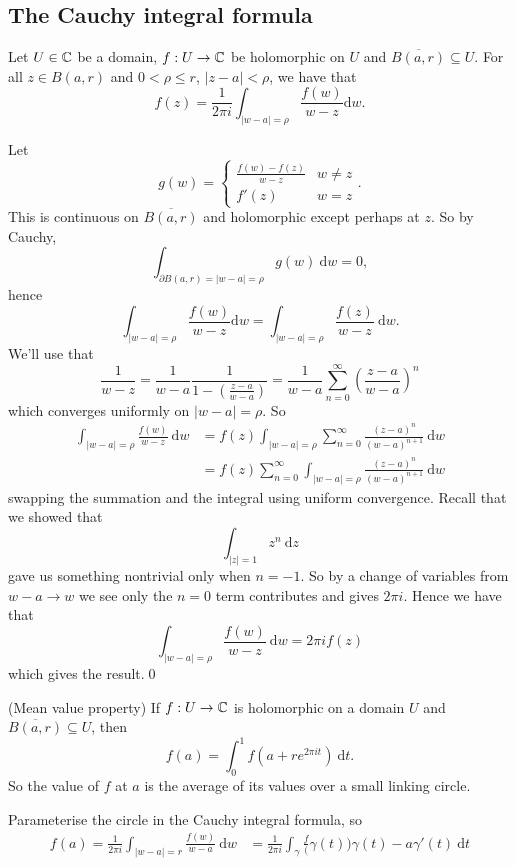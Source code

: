 \documentclass{article}
\begin{document}
\subsection{The Cauchy integral formula}
\begin{theorem}
	Let $ U\in \mathbb{C} $ be a domain, $ f:U\to \mathbb{C} $ be holomorphic on $ U $ and $ \overline{B(a,r)}\subseteq U $. For all $ z\in B(a,r) $ and $ 0<\rho \le r $, $ |z-a|<\rho $, we have that
	\[
		f(z) = \frac 1{2\pi i}\int_{|w-a|=\rho} \frac{f(w)}{w-z}\mathrm dw.
	\]
\end{theorem}
\pf Let
\[
	g(w) = \begin{cases}
		\frac{f(w)-f(z)}{w-z} & w\ne z\\
		f'(z) & w = z
	\end{cases}.
\]
This is continuous on $ \overline{B(a,r)} $ and holomorphic except perhaps at $ z $. So by Cauchy,
\[
	\int_{\partial B(a,r) = |w-a|=\rho}g(w)\ \mathrm dw = 0,
\]
hence
\[
	\int_{|w-a|=\rho} \frac{f(w)}{w-z}\mathrm dw = \int_{|w-a|=\rho} \frac{f(z)}{w-z}\ \mathrm dw.
\]
We'll use that
\[
	\frac1{w-z} =\frac1{w-a}\frac 1{1-\left(\frac{z-a}{w-a}\right)} = \frac 1{w-a}\sum_{n=0}^\infty \left(\frac {z-a}{w-a}\right)^n
\]
which converges uniformly on $ |w-a|=\rho $. So
\begin{align*}
	\int_{|w-a|=\rho}\frac{f(w)}{w-z}\ \mathrm dw &= f(z) \int_{|w-a|=\rho} \sum_{n=0}^\infty \frac{(z-a)^n}{(w-a)^{n+1}}\ \mathrm dw\\
						      &= f(z)\sum_{n=0}^\infty \int_{|w-a|=\rho}\frac{(z-a)^n}{(w-a)^{n+1}}\ \mathrm dw
\end{align*}
swapping the summation and the integral using uniform convergence. Recall that we showed that
\[
	\int_{|z|=1} z^n \ \mathrm dz
\]
gave us something nontrivial only when $ n=-1 $. So by a change of variables from $ w-a\to w $ we see only the $ n=0 $ term contributes and gives $ 2\pi i $. Hence we have that
\[
	\int_{|w-a|=\rho} \frac{f(w)}{w-z}\ \mathrm dw = 2\pi i f(z)
\]
which gives the result.\qed
\begin{corollary}
	(Mean value property) If $ f:U\to \mathbb{C} $ is holomorphic on a domain $ U $ and $ \overline{B(a,r)}\subseteq U $, then
	\[
		f(a) = \int_0^1 f(a+re^{2\pi i t}) \ \mathrm dt.
	\]
	So the value of $ f $ at $ a $ is the average of its values over a small linking circle.
\end{corollary}
\pf Parameterise the circle in the Cauchy integral formula, so
\begin{align*}
	f(a) = \frac 1{2\pi i} \int_{|w-a|= r} \frac {f(w)}{w-a}\ \mathrm dw &= \frac 1{2\pi i} \int_\gamma \frac f(\gamma(t)){\gamma(t)-a}\gamma'(t)\ \mathrm dt
\end{align*}
\end{document}
